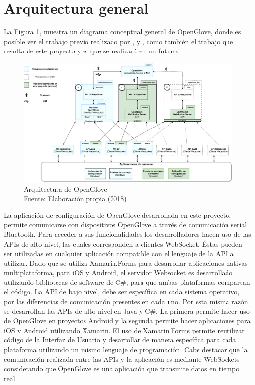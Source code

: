 \section{Arquitectura general}

La Figura \ref{fig:arquitectura-open-glove}, muestra un diagrama conceptual general de OpenGlove, donde es posible ver el trabajo previo realizado por \cite{tesis-monsalve-rodrigo}, \cite{tesis-meneses-sebastian} y \cite{tesis-cerda-rodrigo}, como también el trabajo que resulta de este proyecto y el que se realizará en un futuro.

\begin{figure}[H]
  \begin{center} 
   	\includegraphics[width=1.0\textwidth]{images/chapter04/OpenGlove-Architecture-General.png} 
    \caption[Arquitectura de Openglove]{Arquitectura de OpenGlove \\Fuente: Elaboración propia (2018)}
    \label{fig:arquitectura-open-glove}
  \end{center}
\end{figure}

La aplicación de configuración de OpenGlove desarrollada en este proyecto, permite comunicarse con dispositivos OpenGlove a través de comunicación serial Bluetooth. Para acceder a sus funcionalidades los desarrolladores hacen uso de las APIs de alto nivel, las cuales corresponden a clientes WebSocket. Éstas pueden ser utilizadas en cualquier aplicación compatible con el lenguaje de la API a utilizar. Dado que se utiliza Xamarin.Forms para desarrollar aplicaciones nativas multiplataforma, para iOS y Android, el servidor Websocket es desarrollado utilizando bibliotecas de software de C\#, para que ambas plataformas compartan el código. La API de bajo nivel, debe ser específica en cada sistema operativo, por las diferencias de comunicación presentes en cada uno. Por esta misma razón se desarrollan las APIs de alto nivel en  Java y C\#. La primera permite hacer uso de OpenGlove en proyectos Android y la segunda permite hacer aplicaciones para iOS y Android utilizando Xamarin. El uso de Xamarin.Forms permite reutilizar código de la Interfaz de Usuario y desarrollar de manera específica para cada plataforma utilizando un mismo lenguaje de programación. Cabe destacar que la comunicación realizada entre las APIs y la aplicación es mediante WebSockets considerando que OpenGlove es una aplicación que transmite datos en tiempo real.

